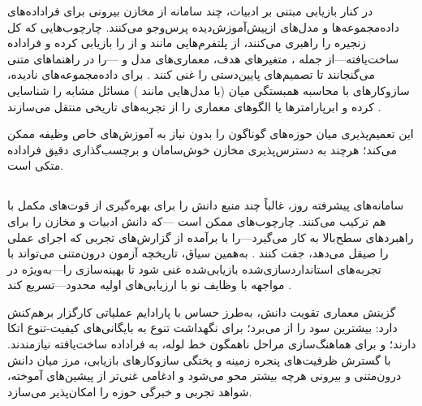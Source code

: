 در کنار بازیابی مبتنی بر ادبیات، چند سامانه از مخازن بیرونی برای فراداده‌های داده‌مجموعه‌ها و مدل‌های ازپیش‌آموزش‌دیده پرس‌وجو می‌کنند. چارچوب‌هایی که کل زنجیره  را راهبری می‌کنند،  از پلتفرم‌هایی مانند  و  از  را بازیابی کرده و فراداده ساخت‌یافته—از جمله ، متغیرهای هدف، معماری‌های مدل و —را در راهنماهای متنی می‌گنجانند تا تصمیم‌های پایین‌دستی را غنی کنند \cite{trirat2025automlagent, shen2023HuggingGPT}. برای داده‌مجموعه‌های نادیده، سازوکارهای  با محاسبه همبستگی میان  (با مدل‌هایی مانند ) مسائل مشابه را شناسایی کرده و ابرپارامترها یا الگوهای معماری را از تجربه‌های تاریخی منتقل می‌سازند \cite{zhang2023AutomlGPTAutomaticMachineLearning}.

این  تعمیم‌پذیری میان حوزه‌های گوناگون را بدون نیاز به آموزش‌های خاص وظیفه ممکن می‌کند؛ هرچند به دسترس‌پذیری مخازن خوش‌سامان و برچسب‌گذاری دقیق فراداده متکی است.

\subsection[راهبردهای تقویت آمیخته]{}

سامانه‌های پیشرفته روز، غالباً چند منبع دانش را برای بهره‌گیری از قوت‌های مکمل با هم ترکیب می‌کنند. چارچوب‌های  ممکن است —که دانش ادبیات و مخازن را برای راهبردهای سطح‌بالا به کار می‌گیرد—را با  برآمده از گزارش‌های تجربی که اجرای عملی را صیقل می‌دهد، جفت کنند \cite{trirat2025automlagent, Yang2025NADER}. به‌همین سیاق، تاریخچه آزمون درون‌متنی می‌تواند با تجربه‌های استانداردسازی‌شده بازیابی‌شده غنی شود تا  بهینه‌سازی را—به‌ویژه در مواجهه با وظایف نو با ارزیابی‌های اولیه محدود—تسریع کند \cite{zhang-etal-2024-MLCopilot}.

گزینش معماری تقویت دانش، به‌طرز حساس با پارادایم عملیاتی کارگزار برهم‌کنش دارد:  بیشترین سود را از  می‌برد؛  برای نگهداشت تنوع به بایگانی‌های کیفیت-تنوع اتکا دارند؛ و  برای هماهنگ‌سازی مراحل ناهمگون خط لوله، به فراداده ساخت‌یافته نیازمندند. با گسترش ظرفیت‌های پنجره زمینه و پختگی سازوکارهای بازیابی، مرز میان دانش درون‌متنی و بیرونی هرچه بیشتر محو می‌شود و ادغامی غنی‌تر از پیشین‌های آموخته، شواهد تجربی و خبرگی حوزه را امکان‌پذیر می‌سازد.